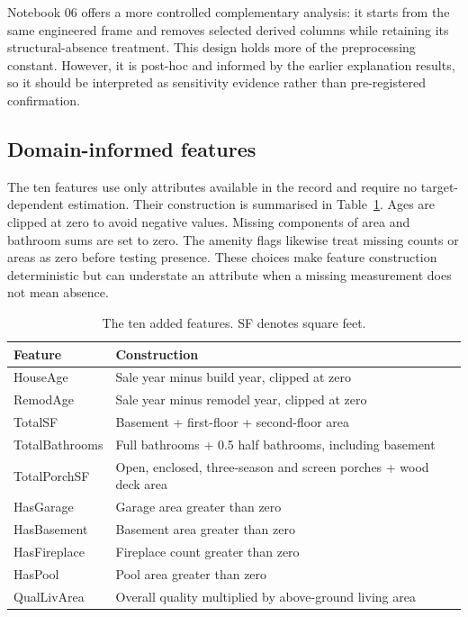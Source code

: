 \documentclass{sigkddExp}
\begin{document}
Notebook 06 offers a more controlled complementary analysis: it starts from the same engineered frame and removes selected derived columns while retaining its structural-absence treatment. This design holds more of the preprocessing constant. However, it is post-hoc and informed by the earlier explanation results, so it should be interpreted as sensitivity evidence rather than pre-registered confirmation.

\subsection{Domain-informed features}
The ten features use only attributes available in the record and require no target-dependent estimation. Their construction is summarised in Table~\ref{tab:features}. Ages are clipped at zero to avoid negative values. Missing components of area and bathroom sums are set to zero. The amenity flags likewise treat missing counts or areas as zero before testing presence. These choices make feature construction deterministic but can understate an attribute when a missing measurement does not mean absence.

\begin{table}[t]
\caption{The ten added features. SF denotes square feet.}
\label{tab:features}
\centering\small
\begin{tabular}{p{}p{}}
\toprule
Feature & Construction \\
\midrule
HouseAge & Sale year minus build year, clipped at zero \\
RemodAge & Sale year minus remodel year, clipped at zero \\
TotalSF & Basement + first-floor + second-floor area \\
TotalBathrooms & Full bathrooms + 0.5 half bathrooms, including basement \\
TotalPorchSF & Open, enclosed, three-season and screen porches + wood deck area \\
HasGarage & Garage area greater than zero \\
HasBasement & Basement area greater than zero \\
HasFireplace & Fireplace count greater than zero \\
HasPool & Pool area greater than zero \\
QualLivArea & Overall quality multiplied by above-ground living area \\
\bottomrule
\end{tabular}
\end{table}
\end{document}
